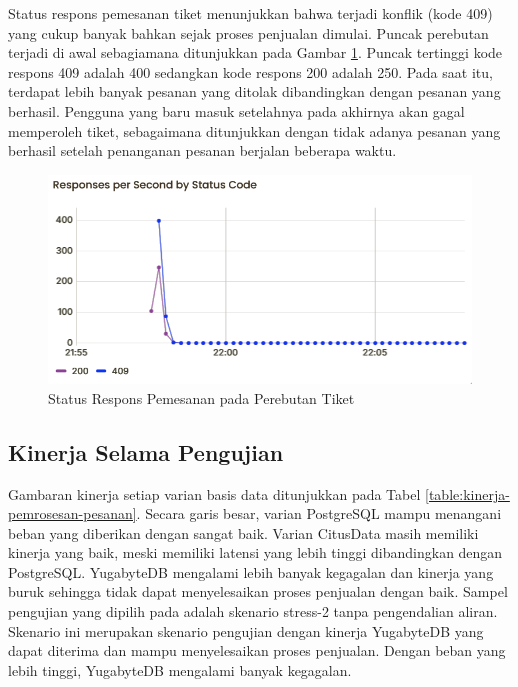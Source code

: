 Status respons pemesanan tiket menunjukkan bahwa terjadi konflik (kode 409) yang cukup banyak bahkan sejak proses penjualan dimulai. Puncak perebutan terjadi di awal sebagiamana ditunjukkan pada Gambar \ref{fig:pattern-sim-order}. Puncak tertinggi kode respons 409 adalah 400 sedangkan kode respons 200 adalah 250. Pada saat itu, terdapat lebih banyak pesanan yang ditolak dibandingkan dengan pesanan yang berhasil. Pengguna yang baru masuk setelahnya pada akhirnya akan gagal memperoleh tiket, sebagaimana ditunjukkan dengan tidak adanya pesanan yang berhasil setelah penanganan pesanan berjalan beberapa waktu.

\begin{figure}[H]
    \centering
    \includegraphics[width=1\textwidth]{resources/chapter-4/pattern-sim-order.png}
    \caption{Status Respons Pemesanan pada Perebutan Tiket}
    \label{fig:pattern-sim-order}
\end{figure}


\subsection{Kinerja Selama Pengujian}

Gambaran kinerja setiap varian basis data ditunjukkan pada Tabel \ref{table:kinerja-pemrosesan-pesanan}. Secara garis besar, varian PostgreSQL mampu menangani beban yang diberikan dengan sangat baik. Varian CitusData masih memiliki kinerja yang baik, meski memiliki latensi yang lebih tinggi dibandingkan dengan PostgreSQL. YugabyteDB mengalami lebih banyak kegagalan dan kinerja yang buruk sehingga tidak dapat menyelesaikan proses penjualan dengan baik. Sampel pengujian yang dipilih pada adalah skenario stress-2 tanpa pengendalian aliran. Skenario ini merupakan skenario pengujian dengan kinerja YugabyteDB yang dapat diterima dan mampu menyelesaikan proses penjualan. Dengan beban yang lebih tinggi, YugabyteDB mengalami banyak kegagalan.

